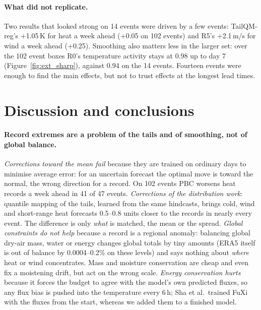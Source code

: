 \documentclass{article}
\newcommand{\R}[1]{\textsf{R#1}}
\begin{document}
\FloatBarrier
\paragraph{What did not replicate.}
Two results that looked strong on 14 events were driven by a few events: TailQM-reg's +1.05\,K for heat a week ahead (+0.05 on 102 events) and \R{5}'s +2.1\,m/s for wind
a week ahead (+0.25). Smoothing also matters less in the larger set: over the 102 event boxes \R{0}'s temperature activity stays at 0.98 up to day 7 (Figure~\ref{fig:ext_sharp}),
against 0.94 on the 14 events. Fourteen events were enough to find the main effects, but not to trust effects at the longest lead times.

\section{Discussion and conclusions}
\label{sec:conclusions}

\paragraph{Record extremes are a problem of the tails and of smoothing, not of global balance.}
\emph{Corrections toward the mean fail} because they are trained on ordinary days to minimise average error: for an uncertain forecast the optimal move is toward the normal,
the wrong direction for a record. On 102 events PBC worsens heat records a week ahead in 41 of 47 events. \emph{Corrections of the distribution work}: quantile mapping of the
tails, learned from the same hindcasts, brings cold, wind and short-range heat forecasts 0.5--0.8 units closer to the records in nearly every event. The difference is only
\emph{what} is matched, the mean or the spread.
\emph{Global constraints do not help} because a record is a regional anomaly: balancing global dry-air mass, water or energy changes global totals by tiny amounts
(ERA5 itself is out of balance by 0.0004--0.2\% on these levels) and says nothing about \emph{where} heat or wind concentrates. Mass and moisture conservation are
cheap and even fix a moistening drift, but act on the wrong scale. \emph{Energy conservation hurts} because it forces the budget to agree with the model's own predicted
fluxes, so any flux bias is pushed into the temperature every 6\,h; Sha et al.\ trained FuXi with the fluxes from the start, whereas we added them to a finished model.
\end{document}
